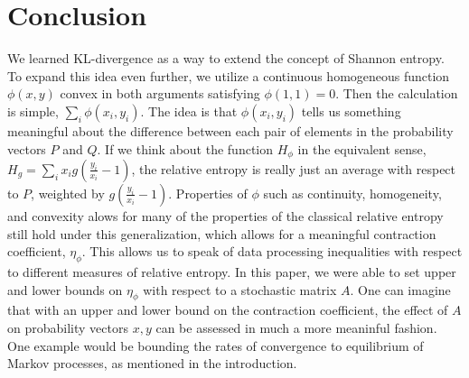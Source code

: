 \section{Conclusion}
We learned KL-divergence as a way to extend the concept of Shannon entropy. To expand this idea even further, we utilize a continuous homogeneous function $\phi(x,y)$ convex in both arguments satisfying $\phi(1,1)=0$. Then the calculation is simple, $\sum_i \phi(x_i, y_i)$. The idea is that $\phi(x_i, y_i)$ tells us something meaningful about the difference between each pair of elements in the probability vectors $P$ and $Q$. If we think about the function $H_\phi$ in the equivalent sense, $H_g = \sum_i x_i g\left(\frac{y_i}{x_i} - 1\right)$, the relative entropy is really just an average with respect to $P$, weighted by $g\left(\frac{y_i}{x_i}-1\right)$. Properties of $\phi$ such as continuity, homogeneity, and convexity alows for many of the properties of the classical relative entropy still hold under this generalization, which allows for a meaningful contraction coefficient, $\eta_\phi$. This allows us to speak of data processing inequalities with respect to different measures of relative entropy. In this paper, we were able to set upper and lower bounds on $\eta_\phi$ with respect to a stochastic matrix $A$. One can imagine that with an upper and lower bound on the contraction coefficient, the effect of $A$ on probability vectors $x,y$ can be assessed in much a more meaninful fashion. One example would be bounding the rates of convergence to equilibrium of Markov processes, as mentioned in the introduction. 



